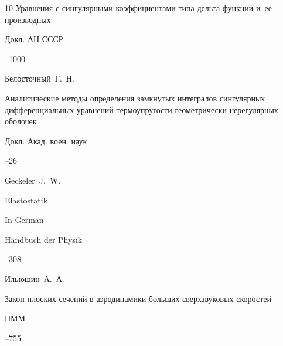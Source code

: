 \begin{thebibliography}{10}
\paper Уравнения с сингулярными коэффициентами типа дельта-функции и~ее производных

\jour Докл. АН СССР




--1000













\by  Белосточный~Г.~Н.

\paper  Аналитические методы определения замкнутых интегралов сингулярных дифференциальных уравнений термоупругости геометрически нерегулярных оболочек

\jour Докл. Акад. воен. наук



--26






\by Geckeler~J.~W.

\paper Elastostatik

\lang In German


\inbook Handbuch der Physik 


--308







\by Ильюшин~А.~А.

\paper  Закон плоских сечений в аэродинамики больших сверхзвуковых скоростей 

\jour ПММ



--755








\end{thebibliography}

